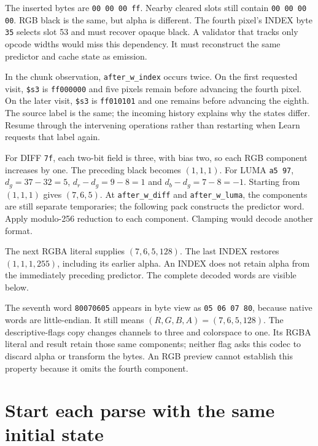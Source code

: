 

The inserted bytes are \texttt{00 00 00 ff}. Nearby cleared slots still contain
\texttt{00 00 00 00}. RGB black is the same, but alpha is different. The
fourth pixel's INDEX byte \texttt{35} selects slot 53 and must recover opaque
black. A validator that tracks only opcode widths would miss this dependency.
It must reconstruct the same predictor and cache state as emission.

In the chunk observation, \texttt{after\_w\_index} occurs twice. On the first
requested visit, \texttt{\$s3} is \texttt{ff000000} and five pixels remain
before advancing the fourth pixel. On the later visit, \texttt{\$s3} is
\texttt{ff010101} and one remains before advancing the eighth. The source label
is the same; the incoming history explains why the states differ. Resume through
the intervening operations rather than restarting when Learn requests that label
again.

For DIFF \texttt{7f}, each two-bit field is three, with bias two, so each RGB
component increases by one. The preceding black becomes $(1,1,1)$.
For LUMA \texttt{a5 97}, $d_g=37-32=5$, $d_r-d_g=9-8=1$ and
$d_b-d_g=7-8=-1$. Starting from $(1,1,1)$ gives $(7,6,5)$.
At \texttt{after\_w\_diff} and \texttt{after\_w\_luma}, the components
are still separate temporaries; the following pack constructs the predictor word.
Apply modulo-256 reduction to each component. Clamping would decode another format.

The next RGBA literal supplies $(7,6,5,128)$. The last INDEX restores
$(1,1,1,255)$, including its earlier alpha. An INDEX does not retain alpha from
the immediately preceding predictor. The complete decoded words are visible below.



The seventh word \texttt{80070605} appears in byte view as
\texttt{05 06 07 80}, because native words are little-endian. It still means
$(R,G,B,A)=(7,6,5,128)$. The descriptive-flags copy changes channels to three
and colorspace to one. Its RGBA literal and result retain those same components;
neither flag asks this codec to discard alpha or transform the bytes. An RGB
preview cannot establish this property because it omits the fourth component.

\section{Start each parse with the same initial state}

